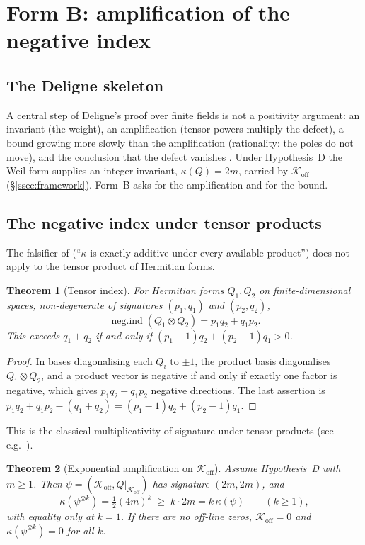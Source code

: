 \documentclass[11pt]{amsart}
\newtheorem{theorem}{Theorem}[section]
\theoremstyle{definition}
\theoremstyle{remark}
\newcommand{\Koff}{\mathcal{K}_{\mathrm{off}}}
\newcommand{\negind}{\operatorname{neg.ind}}
\begin{document}
\section{Form B: amplification of the negative index}\label{sec:formB}

\subsection{The Deligne skeleton}
A central step of Deligne's proof over finite fields \cite{Del74} is not a positivity argument:
an invariant (the weight), an amplification (tensor powers multiply the defect), a bound
growing more slowly than the amplification (rationality: the poles do not move), and the
conclusion that the defect vanishes \cite[\S7]{P27}. Under Hypothesis~D the Weil form supplies an
integer invariant, $\kappa(Q)=2m$, carried by $\Koff$ (\S\ref{ssec:framework}). Form~B asks for
the amplification and for the bound.

\subsection{The negative index under tensor products}
The falsifier of \cite[\S7]{P27} (``$\kappa$ is exactly additive under every available
product'') does not apply to the tensor product of Hermitian forms.

\begin{theorem}[Tensor index]\label{thm:tensor-index}
For Hermitian forms $Q_1,Q_2$ on finite-dimensional spaces, non-degenerate of signatures
$(p_1,q_1)$ and $(p_2,q_2)$,
\[
\negind(Q_1\otimes Q_2)=p_1q_2+q_1p_2.
\]
This exceeds $q_1+q_2$ if and only if $(p_1-1)q_2+(p_2-1)q_1>0$.
\end{theorem}

\begin{proof}
In bases diagonalising each $Q_i$ to $\pm1$, the product basis diagonalises $Q_1\otimes Q_2$,
and a product vector is negative if and only if exactly one factor is negative, which gives
$p_1q_2+q_1p_2$ negative directions. The last assertion is
$p_1q_2+q_1p_2-(q_1+q_2)=(p_1-1)q_2+(p_2-1)q_1$.
\end{proof}

This is the classical multiplicativity of signature under tensor products (see e.g.\
\cite[Ch.~II]{Lam}).

\begin{theorem}[Exponential amplification on $\Koff$]\label{thm:amplify}
Assume Hypothesis~D with $m\ge1$. Then $\psi=(\Koff,Q|_{\Koff})$ has signature $(2m,2m)$, and
\[
\kappa(\psi^{\otimes k})=\tfrac12(4m)^k\;\ge\;k\cdot2m=k\,\kappa(\psi)
\qquad(k\ge1),
\]
with equality only at $k=1$. If there are no off-line zeros, $\Koff=0$ and
$\kappa(\psi^{\otimes k})=0$ for all $k$.
\end{theorem}
\end{document}
